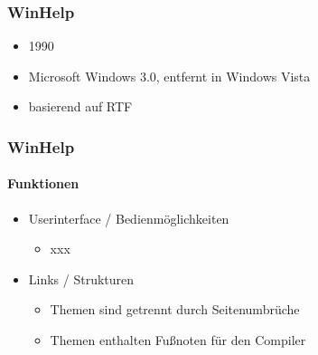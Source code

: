 \begin{frame}
\frametitle{WinHelp}
\begin{itemize}
	\item 1990
	\item Microsoft Windows 3.0, entfernt in Windows Vista
	\item basierend auf RTF
\end{itemize}

\end{frame}

\begin{frame}
\frametitle{WinHelp}
\framesubtitle{Funktionen}
	\begin{itemize}
		\item Userinterface / Bedienmöglichkeiten
		\begin{itemize}
			\item xxx
		\end{itemize}
		\item Links / Strukturen
		\begin{itemize}
			\item Themen sind getrennt durch Seitenumbrüche
			\item Themen enthalten Fußnoten für den Compiler 
		\end{itemize}
	\end{itemize}
\end{frame}

